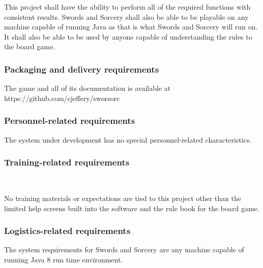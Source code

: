 \documentclass[twoside,letterpaper,pdftex]{article}
\begin{document}
This project shall have the ability to perform all of the required functions with consistent results. Swords and Sorcery shall also be able to be playable on any machine capable of running Java as that is what Swords and Sorcery will run on. It shall also be able to be used by anyone capable of understanding the rules to the board game.


\subsubsection[Packaging and delivery requirements]{\rmfamily\bfseries
Packaging and delivery requirements}
\hypertarget{RefHeading19259017292}{}{\itshape
}

The game and all of its documentation is available at https://github.com/cjeffery/sworsorc

\subsubsection[Personnel{}-related requirements]{\rmfamily\bfseries
Personnel-related requirements}
\hypertarget{RefHeading19459017292}{}{
{\textit{ }}\foreignlanguage{english}{ }}

{\color{black}
The system under development has no special personnel-related characteristics. }

\subsubsection[Training{}-related requirements]{\rmfamily\bfseries\color{black} Training-related
requirements}
\hypertarget{RefHeading19659017292}{}{\color{black}
\foreignlanguage{english}{\textit{ }}\foreignlanguage{english}{ \ \ }}

{\color{black}
No training materials or expectations are tied to this project other than the limited help screens built into the
software and the rule book for the board game.}

\subsubsection[Logistics{}-related requirements]{\rmfamily\bfseries\color{black}
Logistics-related requirements}
\hypertarget{RefHeading19859017292}{}{\itshape\color{black}
}

{The system requirements for Swords and Sorcery are any machine capable of running Java 8 run time environment.}
\end{document}
